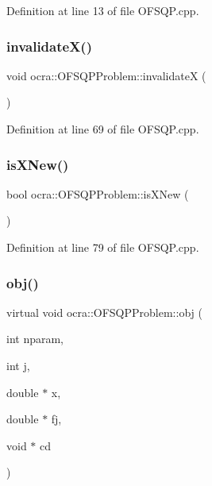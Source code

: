 Definition at line 13 of file O\+F\+S\+Q\+P.\+cpp.

\hypertarget{classocra_1_1OFSQPProblem_a65096824ee00c0254cfeee877dba0141}{}\label{classocra_1_1OFSQPProblem_a65096824ee00c0254cfeee877dba0141} 
\subsubsection{\texorpdfstring{invalidate\+X()}{invalidateX()}}
{\footnotesize\ttfamily void ocra\+::\+O\+F\+S\+Q\+P\+Problem\+::invalidateX (\begin{DoxyParamCaption}{ }\end{DoxyParamCaption})}



Definition at line 69 of file O\+F\+S\+Q\+P.\+cpp.

\hypertarget{classocra_1_1OFSQPProblem_a3c43fbd5d2ef3aeb9c6d936c83d34464}{}\label{classocra_1_1OFSQPProblem_a3c43fbd5d2ef3aeb9c6d936c83d34464} 
\subsubsection{\texorpdfstring{is\+X\+New()}{isXNew()}}
{\footnotesize\ttfamily bool ocra\+::\+O\+F\+S\+Q\+P\+Problem\+::is\+X\+New (\begin{DoxyParamCaption}{ }\end{DoxyParamCaption})}



Definition at line 79 of file O\+F\+S\+Q\+P.\+cpp.

\hypertarget{classocra_1_1OFSQPProblem_adca0c224eb1b9f6e0c2d17f07277a899}{}\label{classocra_1_1OFSQPProblem_adca0c224eb1b9f6e0c2d17f07277a899} 
\subsubsection{\texorpdfstring{obj()}{obj()}}
{\footnotesize\ttfamily virtual void ocra\+::\+O\+F\+S\+Q\+P\+Problem\+::obj (\begin{DoxyParamCaption}\item[{int}]{nparam,  }\item[{int}]{j,  }\item[{double $\ast$}]{x,  }\item[{double $\ast$}]{fj,  }\item[{void $\ast$}]{cd }\end{DoxyParamCaption})\hspace{0.3cm}{\ttfamily [pure virtual]}}




